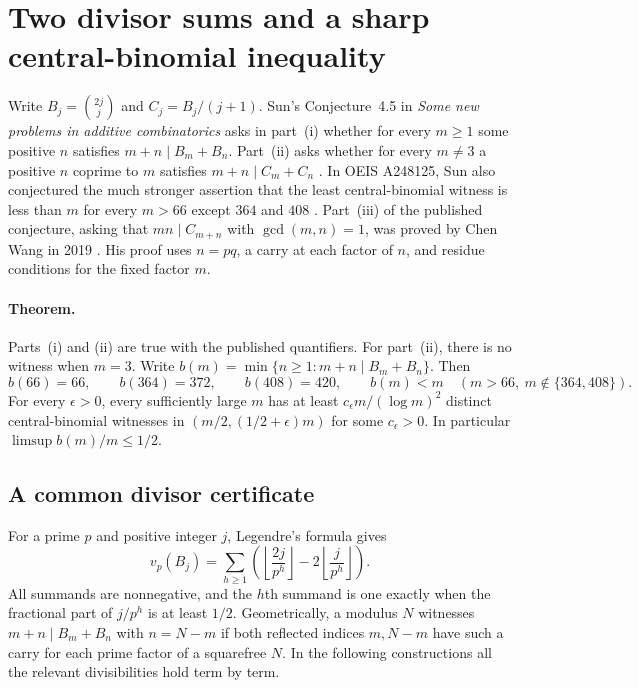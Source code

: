 \documentclass[11pt,a4paper]{article}
\numberwithin{equation}{section}
\begin{document}
\clearpage

\section{Two divisor sums and a sharp central-binomial inequality}\label{sec:sun}

Write $B_j=\binom{2j}{j}$ and $C_j=B_j/(j+1)$. Sun's Conjecture~4.5
in \emph{Some new problems in additive combinatorics} asks in part~(i)
whether for every $m\ge1$ some positive $n$ satisfies
$m+n\mid B_m+B_n$. Part~(ii) asks whether for every $m\ne3$ a
positive $n$ coprime to $m$ satisfies $m+n\mid C_m+C_n$
\cite{SunAdditive}. In OEIS A248125, Sun also conjectured the much
stronger assertion that the least central-binomial witness is less
than $m$ for every $m>66$ except $364$ and $408$ \cite{SunCentral}.
Part~(iii) of the published conjecture, asking that $mn\mid C_{m+n}$
with $\gcd(m,n)=1$, was proved by Chen Wang in 2019
\cite{WangCatalan}. His proof uses $n=pq$, a carry at each
factor of $n$, and residue conditions for the fixed factor $m$.

\paragraph{Theorem.}
Parts~(i) and (ii) are true with the published quantifiers.
For part~(ii), there is no witness when $m=3$.
Write $b(m)=\min\{n\ge1:m+n\mid B_m+B_n\}$. Then
\[
 b(66)=66,\qquad b(364)=372,\qquad b(408)=420,\qquad
 b(m)<m\quad(m>66,\ m\notin\{364,408\}).
\]
For every $\epsilon>0$, every sufficiently large $m$ has at least
$c_\epsilon m/(\log m)^2$ distinct central-binomial witnesses in
$(m/2,(1/2+\epsilon)m)$ for some $c_\epsilon>0$. In particular
$\limsup b(m)/m\le1/2$.

\subsection{A common divisor certificate}

For a prime $p$ and positive integer $j$, Legendre's formula gives
\[
 v_p(B_j)=\sum_{h\ge1}
 \left(\left\lfloor\frac{2j}{p^h}\right\rfloor
       -2\left\lfloor\frac{j}{p^h}\right\rfloor\right).
\]
All summands are nonnegative, and the $h$th summand is one exactly
when the fractional part of $j/p^h$ is at least $1/2$.
Geometrically, a modulus $N$ witnesses $m+n\mid B_m+B_n$ with
$n=N-m$ if both reflected indices $m,N-m$ have such a carry for
each prime factor of a squarefree $N$. In the following constructions
all the relevant divisibilities hold term by term.
\end{document}
